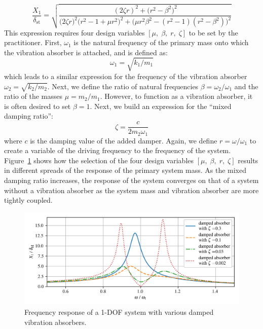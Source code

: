 \documentclass[12pt,letter]{article}
\begin{document}
\begin{equation}
\frac{X_1}{\delta_{\text{st}}} = \sqrt{\frac{(2 \zeta r)^2 + \big(r^2 - \beta^2 \big)^2 }{\big(2 \zeta r \big)^2 \big(r^2 -1 +\mu r^2 \big)^2 + \big(\mu r^2 \beta^2 - (r^2 -1)(r^2 -\beta^2)\big)^2} }
\label{eq:X1_norm_displacement_damped}
\end{equation}
This expression requires four design variables $[\mu, \; \beta, \; r, \; \zeta]$ to be set by the practitioner. First, $\omega_1$ is the natural frequency of the primary mass onto which the vibration absorber is attached, and is defined as:
\begin{equation}
\omega_1 = \sqrt{k_1/m_1}
\end{equation}
which leads to a similar expression for the frequency of the vibration absorber $\omega_2 = \sqrt{k_2/m_2}$. Next, we define the ratio of natural frequencies $\beta = \omega_2/ \omega_1$ and the ratio of the masses $\mu = m_2/m_1$. However, to function as a vibration absorber, it is often desired to set $\beta = 1$. Next, we build an expression for the ``mixed damping ratio'':
\begin{equation}
\zeta = \frac{c}{2 m_2 \omega_1}
\end{equation}
where $c$ is the damping value of the added damper. Again, we define $r=\omega / \omega_1$ to create a variable of the driving frequency to the frequency of the system. Figure~\ref{fig:vibration_absorber_damped_results} shows how the selection of the four design variables $[\mu, \; \beta, \; r, \; \zeta]$ results in different spreads of the response of the primary system mass. As the mixed damping ratio increases, the response of the system converges on that of a system without a vibration absorber as the system mass and vibration absorber are more tightly coupled. 

\begin{figure}[H]
    \centering
    \includegraphics[width=6.5in]{../figures/vibration_absorber_damped_results.png}
    \caption{Frequency response of a 1-DOF system with various damped vibration absorbers.}
    \label{fig:vibration_absorber_damped_results}
\end{figure}
\end{document}
